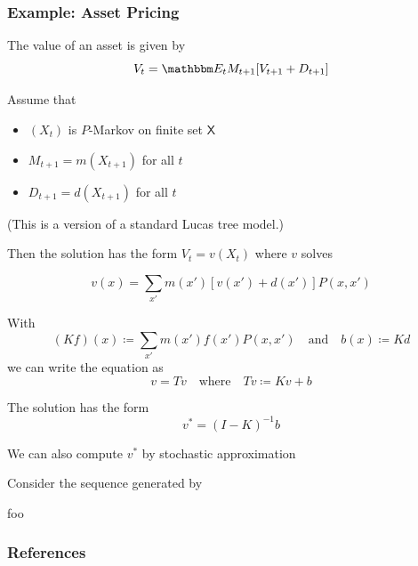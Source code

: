 \documentclass[xcolor=dvipsnames]{beamer}  %
\newcommand{\1}{\mathbbm 1}
\newcommand{\EE}{\mathbbm E}
\newcommand{\XX}{\mathsf X}
\begin{document}
\begin{frame}
    \frametitle{Example: Asset Pricing}

    The value of an asset is given by
    \begin{equation*}
        V_t = \EE_t M_{t+1} [V_{t+1} + D_{t+1}]
    \end{equation*}

    Assume that 
    \begin{itemize}
        \item $(X_t)$ is $P$-Markov on finite set $\XX$
        \item $M_{t+1} = m(X_{t+1})$ for all $t$
        \item $D_{t+1} = d(X_{t+1})$ for all $t$
    \end{itemize}

    (This is a version of a standard Lucas tree model.)

\end{frame}

\begin{frame}
    
    Then the solution has the form $V_t = v(X_t)$ where $v$ solves

    \begin{equation*}
        v(x) = \sum_{x'} m(x') [v(x') + d(x')]  P(x,x') 
    \end{equation*}

    With 
    \begin{equation*}
        (Kf)(x) \coloneq \sum_{x'} m(x') f(x')  P(x,x') 
        \quad \text{and} \quad
        b(x) \coloneq Kd
    \end{equation*}
    we can write the equation as 
    \begin{equation*}
        v = Tv 
        \quad \text{where} \quad
        Tv \coloneq Kv + b
    \end{equation*}

    The solution has the form
    \begin{equation*}
        v^* = (I - K)^{-1} b
    \end{equation*}

\end{frame}

\begin{frame}
    
    We can also compute $v^*$ by stochastic approximation

    Consider the sequence generated by

    \begin{algorithm}
        \DontPrintSemicolon
        foo
    \end{algorithm}


\end{frame}


\begin{frame}[allowframebreaks]
    \frametitle{References}

    

    

\end{frame}
\end{document}
